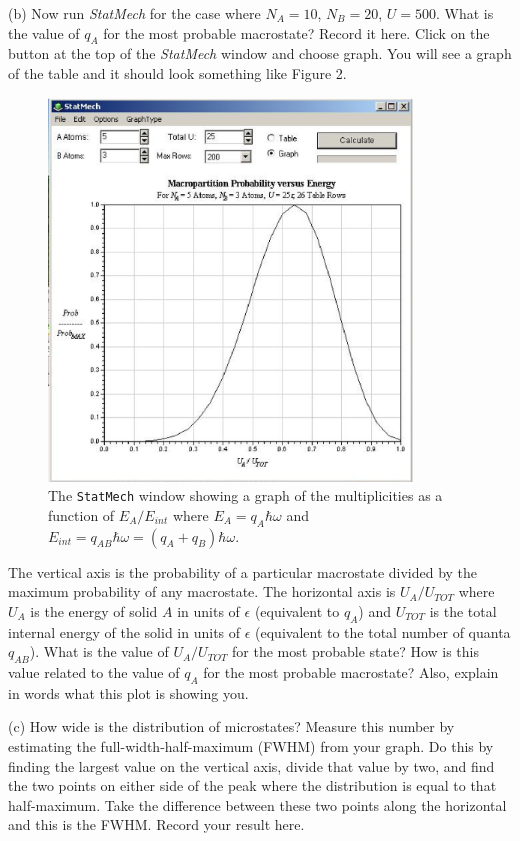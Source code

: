 (b) Now run {\it StatMech} for the case where $N_A = 10$, $N_B=20$, $U = 500$.
What is the value of $q_A$ for the most probable macrostate? 
Record it here.
Click on the button at the top of the {\it StatMech} window and choose graph.
You will see a graph of the table  and it should look something like
Figure 2.
\begin{figure}[!ht]
\begin{center}
\includegraphics[height=4.0in]{EinsteinSolid/statmech2.eps}
\caption{The {\tt StatMech} window showing a graph of the multiplicities as a function
of $E_A/E_{int}$ where $E_A = q_A \hbar \omega$ and 
$E_{int} = q_{AB} \hbar \omega = (q_A+q_B)\hbar \omega$.}
\end{center}
\end{figure}
The vertical axis is the probability of a particular macrostate divided by the maximum
probability of any macrostate.
The horizontal axis is  $U_A/U_{TOT}$ where 
$U_A$ is the energy of solid $A$ in units of $\epsilon$ (equivalent to $q_A$) and $U_{TOT}$ is the total
internal energy of the solid in units of $\epsilon$ (equivalent 
to the total number of quanta $q_{AB}$).
What is the value of $U_A/U_{TOT}$ for the most probable state?
How is this value related to the value of $q_A$ for the most probable macrostate? 
Also, explain in words what this plot is showing you.
\vspace{25mm}

(c) How wide is the distribution of microstates?
Measure this number by estimating the full-width-half-maximum (FWHM) from your graph.
Do this by finding the largest value on the vertical axis, divide that value by two, and find
the two points on either side of the peak where the distribution is equal to that
half-maximum.
Take the difference between these two points along the horizontal and this is the FWHM.
Record your result here.
\answerspace{20mm}

